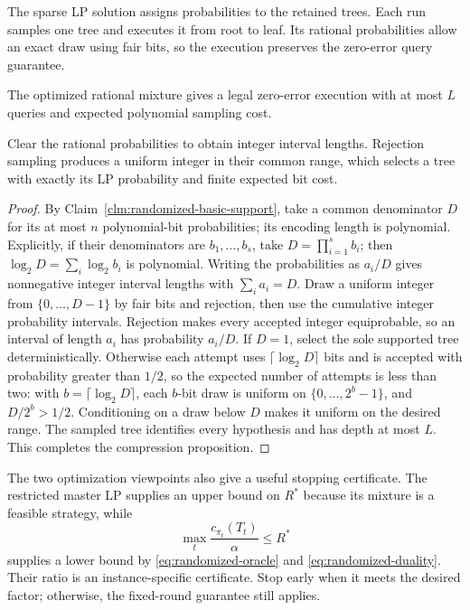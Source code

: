 The sparse LP solution assigns probabilities to the retained trees.
Each run samples one tree and executes it from root to leaf. Its
rational probabilities allow an exact draw using fair bits, so the
execution preserves the zero-error query guarantee.
\begin{claim}
\label{clm:randomized-exact-sampling}
The optimized rational mixture gives a legal zero-error execution
with at most $L$ queries and expected polynomial sampling cost.
\end{claim}
\begin{proofstrategy}
Clear the rational probabilities to obtain integer interval lengths.
Rejection sampling produces a uniform integer in their common range,
which selects a tree with exactly its LP probability and finite
expected bit cost.
\end{proofstrategy}
\begin{proof}
By Claim~\ref{clm:randomized-basic-support}, take a common denominator
$D$ for its at most $n$ polynomial-bit probabilities;
its encoding length is polynomial. Explicitly, if their denominators
are $b_1,\ldots,b_s$, take $D=\prod_{i=1}^s b_i$; then
$\log_2D=\sum_i\log_2b_i$ is polynomial. Writing the probabilities
as $a_i/D$ gives nonnegative integer interval lengths with
$\sum_i a_i=D$. Draw a uniform integer from
$\{0,\ldots,D-1\}$ by fair bits and rejection, then use the
cumulative integer probability intervals. Rejection makes every
accepted integer equiprobable, so an interval of length $a_i$ has
probability $a_i/D$. If $D=1$, select the sole supported tree
deterministically. Otherwise each attempt uses
$\lceil\log_2D\rceil$ bits and is accepted with probability
greater than $1/2$, so the expected number of attempts is less
than two: with $b=\lceil\log_2D\rceil$, each $b$-bit draw is uniform
on $\{0,\ldots,2^b-1\}$, and
$D/2^b>1/2$. Conditioning on a draw below $D$ makes it uniform
on the desired range.
The sampled tree identifies every hypothesis and has
depth at most $L$. This completes the compression proposition.
\end{proof}

The two optimization viewpoints also give a useful stopping
certificate. The restricted master LP supplies an upper bound on
$R^*$ because its mixture is a feasible strategy, while
\[
 \max_t\frac{c_{\pi_t}(T_t)}\alpha\le R^*
\]
supplies a lower bound by \eqref{eq:randomized-oracle} and
\eqref{eq:randomized-duality}. Their ratio is an instance-specific
certificate. Stop early when it meets the desired factor; otherwise,
the fixed-round guarantee still applies.

